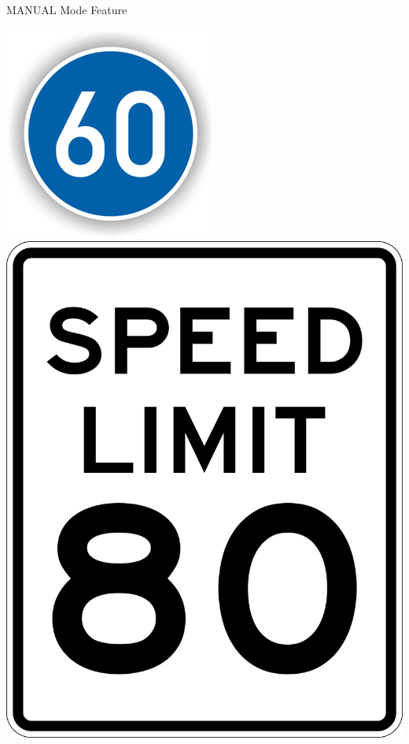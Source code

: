 \documentclass[aspectratio=169]{beamer}
\begin{document}
\begin{frame}{MANUAL Mode Feature}
    \begin{multicols}{2}
        \pause%
        \includegraphics[width=\linewidth]{media/minSpeed.png}
        \pause%
        \includegraphics[height=.7\paperheight]{media/speedLimit.png}
    \end{multicols}
\end{frame}
\end{document}
